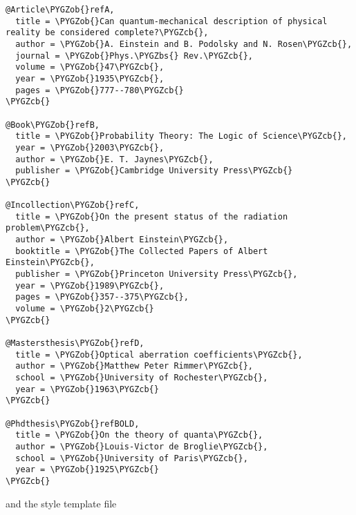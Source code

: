 \documentclass[letterpaper,10pt,english]{sphinxmanual}
\def\PYGZbs{\char`\\}
\def\PYGZob{\char`\{}
\def\PYGZcb{\char`\}}
\begin{document}
\begin{Verbatim}[commandchars=\\\{\}]
@Article\PYGZob{}refA,
  title = \PYGZob{}Can quantum-mechanical description of physical reality be considered complete?\PYGZcb{},
  author = \PYGZob{}A. Einstein and B. Podolsky and N. Rosen\PYGZcb{},
  journal = \PYGZob{}Phys.\PYGZbs{} Rev.\PYGZcb{},
  volume = \PYGZob{}47\PYGZcb{},
  year = \PYGZob{}1935\PYGZcb{},
  pages = \PYGZob{}777--780\PYGZcb{}
\PYGZcb{}

@Book\PYGZob{}refB,
  title = \PYGZob{}Probability Theory: The Logic of Science\PYGZcb{},
  year = \PYGZob{}2003\PYGZcb{},
  author = \PYGZob{}E. T. Jaynes\PYGZcb{},
  publisher = \PYGZob{}Cambridge University Press\PYGZcb{}
\PYGZcb{}

@Incollection\PYGZob{}refC,
  title = \PYGZob{}On the present status of the radiation problem\PYGZcb{},
  author = \PYGZob{}Albert Einstein\PYGZcb{},
  booktitle = \PYGZob{}The Collected Papers of Albert Einstein\PYGZcb{},
  publisher = \PYGZob{}Princeton University Press\PYGZcb{},
  year = \PYGZob{}1989\PYGZcb{},
  pages = \PYGZob{}357--375\PYGZcb{},
  volume = \PYGZob{}2\PYGZcb{}
\PYGZcb{}

@Mastersthesis\PYGZob{}refD,
  title = \PYGZob{}Optical aberration coefficients\PYGZcb{},
  author = \PYGZob{}Matthew Peter Rimmer\PYGZcb{},
  school = \PYGZob{}University of Rochester\PYGZcb{},
  year = \PYGZob{}1963\PYGZcb{}
\PYGZcb{}

@Phdthesis\PYGZob{}refBOLD,
  title = \PYGZob{}On the theory of quanta\PYGZcb{},
  author = \PYGZob{}Louis-Victor de Broglie\PYGZcb{},
  school = \PYGZob{}University of Paris\PYGZcb{},
  year = \PYGZob{}1925\PYGZcb{}
\PYGZcb{}
\end{Verbatim}

and the style template file
\end{document}
